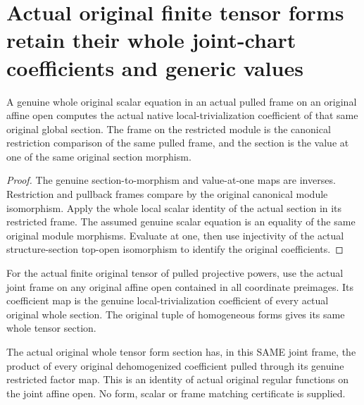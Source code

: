 \section{Actual original finite tensor forms retain their whole joint-chart coefficients and generic values}
\begin{lemma}\label{lem:original-subopen-frame-coefficient-of-scalar}
\leanok
{}
A genuine whole original scalar equation in an actual pulled frame on an original affine open computes the actual native local-trivialization coefficient of that same original global section. The frame on the restricted module is the canonical restriction comparison of the same pulled frame, and the section is the value at one of the same original section morphism.
\end{lemma}
\begin{proof}
The genuine section-to-morphism and value-at-one maps are inverses. Restriction and pullback frames compare by the original canonical module isomorphism. Apply the whole local scalar identity of the actual section in its restricted frame. The assumed genuine scalar equation is an equality of the same original module morphisms. Evaluate at one, then use injectivity of the actual structure-section top-open isomorphism to identify the original coefficients.
\end{proof}
\begin{definition}\label{def:original-finite-projective-tensor-coefficients}
\leanok
{}
For the actual finite original tensor of pulled projective powers, use the actual joint frame on any original affine open contained in all coordinate preimages. Its coefficient map is the genuine local-trivialization coefficient of every actual original whole section. The original tuple of homogeneous forms gives its same whole tensor section.
\end{definition}
\begin{theorem}\label{thm:original-finite-projective-tensor-form-coefficients}
\leanok
{}
The actual original whole tensor form section has, in this SAME joint frame, the product of every original dehomogenized coefficient pulled through its genuine restricted factor map. This is an identity of actual original regular functions on the joint affine open. No form, scalar or frame matching certificate is supplied.
\end{theorem}
